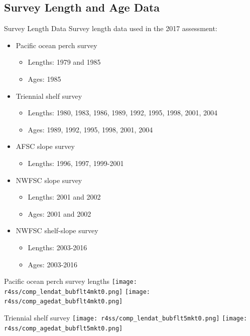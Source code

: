 \documentclass[pdf]{beamer}\usepackage[]{graphicx}\usepackage[]{color}
\begin{document}
\subsection{Survey Length and Age Data}
\begin{frame}{Survey Length Data}
  Survey length data used in the 2017 assessment:
  \begin{itemize}
    \item Pacific ocean perch survey
      \begin{itemize}
        \item Lengths: 1979 and 1985
        \item Ages: 1985
      \end{itemize}
    \item Triennial shelf survey
      \begin{itemize}
        \item Lengths: 1980, 1983, 1986, 1989, 1992, 1995, 1998, 2001, 2004
        \item Ages: 1989, 1992, 1995, 1998, 2001, 2004
      \end{itemize}
    \item AFSC slope survey
      \begin{itemize}
        \item Lengths: 1996, 1997, 1999-2001
      \end{itemize}
    \item NWFSC slope survey
      \begin{itemize}
        \item Lengths: 2001 and 2002
        \item Ages: 2001 and 2002
      \end{itemize}
    \item NWFSC shelf-slope survey
      \begin{itemize}
        \item Lengths: 2003-2016
        \item Ages: 2003-2016
      \end{itemize}
  \end{itemize}
\end{frame}


\begin{frame}{Pacific ocean perch survey lengths}
  \texttt{[image: r4ss/comp\_lendat\_bubflt4mkt0.png]}
  \texttt{[image: r4ss/comp\_agedat\_bubflt4mkt0.png]}
\end{frame}

\begin{frame}{Triennial shelf survey }
  \texttt{[image: r4ss/comp\_lendat\_bubflt5mkt0.png]}
  \texttt{[image: r4ss/comp\_agedat\_bubflt5mkt0.png]}
\end{frame}
\end{document}
